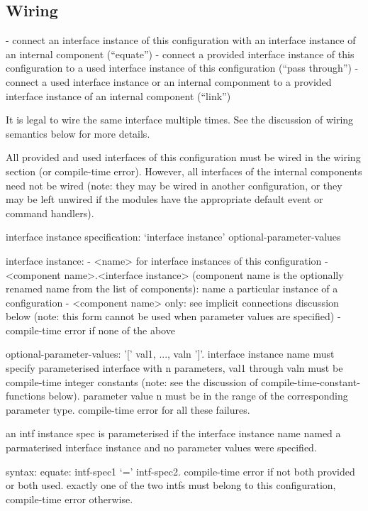 \documentclass[11pt]{article}
\begin{document}
\subsection{Wiring}

- connect an interface instance of this configuration with an interface
instance of an internal component (``equate'')
- connect a provided interface instance of this configuration to a used
interface instance of this configuration (``pass through'')
- connect a used interface instance or an internal componment to a provided
interface instance of an internal component (``link'')

It is legal to wire the same interface multiple times. See the discussion
of wiring semantics below for more details.

All provided and used interfaces of this configuration must be wired in the
wiring section (or compile-time error). However, all interfaces of the
internal components need not be wired (note: they may be wired in another
configuration, or they may be left unwired if the modules have the
appropriate default event or command handlers).

interface instance specification: `interface instance'  optional-parameter-values

interface instance:
- <name> for interface instances of this configuration
- <component name>.<interface instance> (component name is the
optionally renamed name from the list of components): name a particular
instance of a configuration
- <component name> only: see implicit connections discussion below (note:
this form cannot be used when parameter values are specified)
- compile-time error if none of the above

optional-parameter-values: '[' val1, ..., valn ']'. interface instance name
must specify parameterised interface with n parameters, val1 through valn
must be compile-time integer constants (note: see the discussion of
compile-time-constant-functions below). parameter value n must be in the
range of the corresponding parameter type. compile-time error for all
these failures.

an intf instance spec is parameterised if the interface instance name
named a parmaterised interface instance and no parameter values were
specified.

syntax:
equate: intf-spec1 `=' intf-spec2. compile-time error if not both 
provided or both used. exactly one of the two intfs must belong
to this configuration, compile-time error otherwise. 
\end{document}
